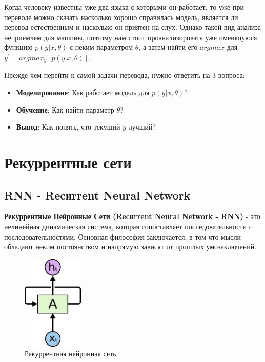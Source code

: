 	Когда человеку известны уже два языка с которыми он работает, то уже при переводе можно сказать насколько хорошо справилась модель, является ли перевод естественным и насколько он приятен на слух. Однако такой вид анализа неприемлем для машины, поэтому нам стоит проанализировать уже имеющуюся функцию $p(y|x,\theta)$ с неким параметром $\theta$, а затем найти его $argmax$ для $y^{'} = argmax_{y}[p(y|x, \theta)]$.
	
	Прежде чем перейти к самой задачи перевода, нужно ответить на 3 вопроса:
	
	\begin{itemize}
		\item \textbf{Моделирование}: Как работает модель для $p(y|x, \theta)$?
		\item \textbf{Обучение}: Как найти параметр $\theta$?
		\item \textbf{Вывод}: Как понять, что текущий $y$ лучший?
	\end{itemize}
	
	\clearpage
	
	\section{Рекуррентные сети}
	
	\subsection{RNN - Recиrrent Neural Network}
	
	\textbf{Рекуррентные Нейронные Сети (Recиrrent Neural Network - RNN)} - это нелинейная динамическая система, которая сопоставляет последовательности с последовательностями. Основная философия заключается, в том что мысли обладают неким постоянством и напрямую зависят от прошлых умозаключений. 
	
	\begin{figure}
		\centering
		\captionsetup{justification=centering}
		\includegraphics[height=45mm]{img/2.png}
		\caption{Рекуррентная нейронная сеть}
	\end{figure}
	
